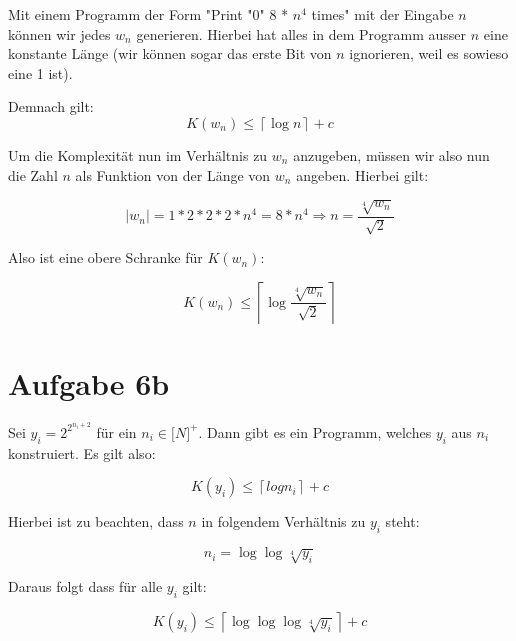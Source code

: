 \documentclass[a4paper]{article}
\begin{document}
	Mit einem Programm der Form "Print "0" 8 * $n^4$ times" mit der Eingabe $n$ können wir jedes $w_n$ generieren.
	Hierbei hat alles in dem Programm ausser $n$ eine konstante Länge (wir können sogar das erste Bit von $n$ ignorieren, weil es sowieso eine 1 ist).

	Demnach gilt:
	\[K(w_n) \leq \left \lceil{\log{n}}\right \rceil + c \]

	Um die Komplexität nun im Verhältnis zu $w_n$ anzugeben, müssen wir also nun die Zahl $n$ als Funktion von der Länge von $w_n$ angeben.
	Hierbei gilt:

	\[\lvert w_n \rvert = 1 * 2 * 2 * 2 * n^4 = 8 * n^4 \Rightarrow n = \frac{\sqrt[4]{w_n}}{\sqrt{2}}\]

	Also ist eine obere Schranke für $K(w_n)$:

	\[K(w_n) \leq \left \lceil{\log{\frac{\sqrt[4]{w_n}}{\sqrt{2}}}}\right \rceil\]

\section{Aufgabe 6b}

	Sei $y_i = 2^{2^{n_{i}+2}}$ für ein $n_i \in \mathbb[N]^+$. Dann gibt es ein Programm, welches $y_i$ aus $n_i$ konstruiert. Es gilt also:

	\[K(y_i) \leq \left \lceil{log{n_i}}\right \rceil + c \]

	Hierbei ist zu beachten, dass $n$ in folgendem Verhältnis zu $y_i$ steht:
	
	\[n_{i} = \log\log\sqrt[4]{y_i} \]

	Daraus folgt dass für alle $y_i$ gilt:

	\[K(y_i) \leq \left \lceil{\log\log\log\sqrt[4]{y_i}}\right \rceil + c \]
	 
\end{document}
